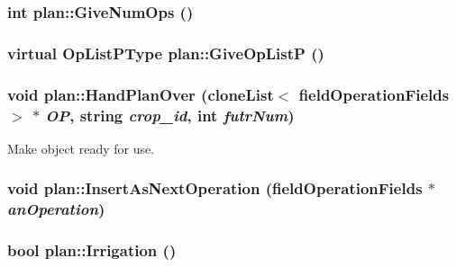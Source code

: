 \label{classplan_a46ca446bb7d23eff9d7f39d36b56d58b}
\hypertarget{classplan_a2e5057eb3ec7c4ad4b20ac628f7ad1e9}{
\subsubsection[{GiveNumOps}]{\setlength{\rightskip}{0pt plus 5cm}int plan::GiveNumOps ()}}
\label{classplan_a2e5057eb3ec7c4ad4b20ac628f7ad1e9}
\hypertarget{classplan_a986121f5ba3cd52b3a728da6ccc9ce5b}{
\subsubsection[{GiveOpListP}]{\setlength{\rightskip}{0pt plus 5cm}virtual {\bf OpListPType} plan::GiveOpListP ()}}
\label{classplan_a986121f5ba3cd52b3a728da6ccc9ce5b}
\hypertarget{classplan_ac480e9366949237b6904a397bfb8b57c}{
\subsubsection[{HandPlanOver}]{\setlength{\rightskip}{0pt plus 5cm}void plan::HandPlanOver ({\bf cloneList}$<$ {\bf fieldOperationFields} $>$ $\ast$ {\em OP}, \/  string {\em crop\_\-id}, \/  int {\em futrNum})}}
\label{classplan_ac480e9366949237b6904a397bfb8b57c}
Make object ready for use. \hypertarget{classplan_a66bc896a7b501149627955ae025d62b0}{
\subsubsection[{InsertAsNextOperation}]{\setlength{\rightskip}{0pt plus 5cm}void plan::InsertAsNextOperation ({\bf fieldOperationFields} $\ast$ {\em anOperation})}}
\label{classplan_a66bc896a7b501149627955ae025d62b0}
\hypertarget{classplan_ad28041911ab26c91eefbd1105d5922ed}{
\subsubsection[{Irrigation}]{\setlength{\rightskip}{0pt plus 5cm}bool plan::Irrigation ()}}
